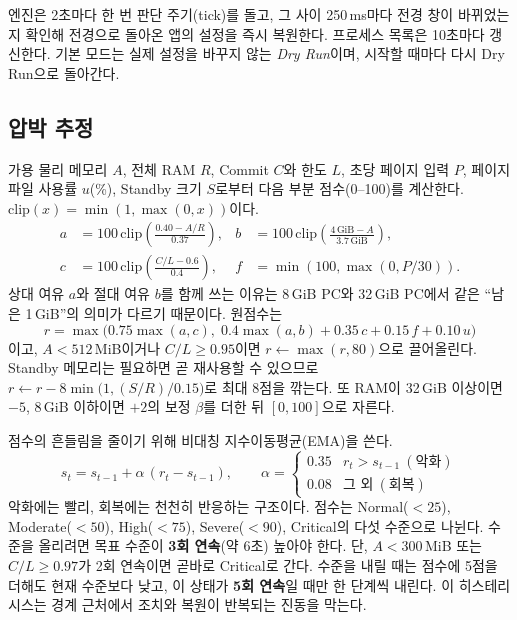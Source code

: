 \documentclass[11pt]{article}
\begin{document}
엔진은 2초마다 한 번 판단 주기(tick)를 돌고, 그 사이 250\,ms마다 전경 창이 바뀌었는지 확인해 전경으로 돌아온 앱의 설정을 즉시 복원한다. 프로세스 목록은 10초마다 갱신한다. 기본 모드는 실제 설정을 바꾸지 않는 \emph{Dry Run}이며, 시작할 때마다 다시 Dry Run으로 돌아간다.

\subsection{압박 추정}
\label{sec:pressure}
가용 물리 메모리 $A$, 전체 RAM $R$, Commit $C$와 한도 $L$, 초당 페이지 입력 $P$, 페이지 파일 사용률 $u$(\%), Standby 크기 $S$로부터 다음 부분 점수(0--100)를 계산한다. $\mathrm{clip}(x)=\min(1,\max(0,x))$이다.
\begin{align}
a &= 100\,\mathrm{clip}\!\left(\frac{0.40 - A/R}{0.37}\right), &
b &= 100\,\mathrm{clip}\!\left(\frac{4\,\mathrm{GiB} - A}{3.7\,\mathrm{GiB}}\right), \nonumber\\
c &= 100\,\mathrm{clip}\!\left(\frac{C/L - 0.6}{0.4}\right), &
f &= \min\!\left(100, \max\!\left(0, P/30\right)\right).
\end{align}
상대 여유 $a$와 절대 여유 $b$를 함께 쓰는 이유는 8\,GiB PC와 32\,GiB PC에서 같은 ``남은 1\,GiB''의 의미가 다르기 때문이다. 원점수는
\begin{equation}
r = \max\!\bigl(0.75\max(a,c),\; 0.4\max(a,b) + 0.35\,c + 0.15\,f + 0.10\,u\bigr)
\end{equation}
이고, $A<512$\,MiB이거나 $C/L\ge0.95$이면 $r\leftarrow\max(r,80)$으로 끌어올린다. Standby 메모리는 필요하면 곧 재사용할 수 있으므로 $r \leftarrow r - 8\min\!\bigl(1, (S/R)/0.15\bigr)$로 최대 8점을 깎는다. 또 RAM이 32\,GiB 이상이면 $-5$, 8\,GiB 이하이면 $+2$의 보정 $\beta$를 더한 뒤 $[0,100]$으로 자른다.

점수의 흔들림을 줄이기 위해 비대칭 지수이동평균(EMA)을 쓴다.
\begin{equation}
s_t = s_{t-1} + \alpha\,(r_t - s_{t-1}),\qquad
\alpha = \begin{cases} 0.35 & r_t > s_{t-1}\ (\text{악화}) \\ 0.08 & \text{그 외}\ (\text{회복}) \end{cases}
\end{equation}
악화에는 빨리, 회복에는 천천히 반응하는 구조이다. 점수는 Normal($<25$), Moderate($<50$), High($<75$), Severe($<90$), Critical의 다섯 수준으로 나뉜다. 수준을 올리려면 목표 수준이 \textbf{3회 연속}(약 6초) 높아야 한다. 단, $A<300$\,MiB 또는 $C/L\ge0.97$가 2회 연속이면 곧바로 Critical로 간다. 수준을 내릴 때는 점수에 5점을 더해도 현재 수준보다 낮고, 이 상태가 \textbf{5회 연속}일 때만 한 단계씩 내린다. 이 히스테리시스는 경계 근처에서 조치와 복원이 반복되는 진동을 막는다.
\end{document}
